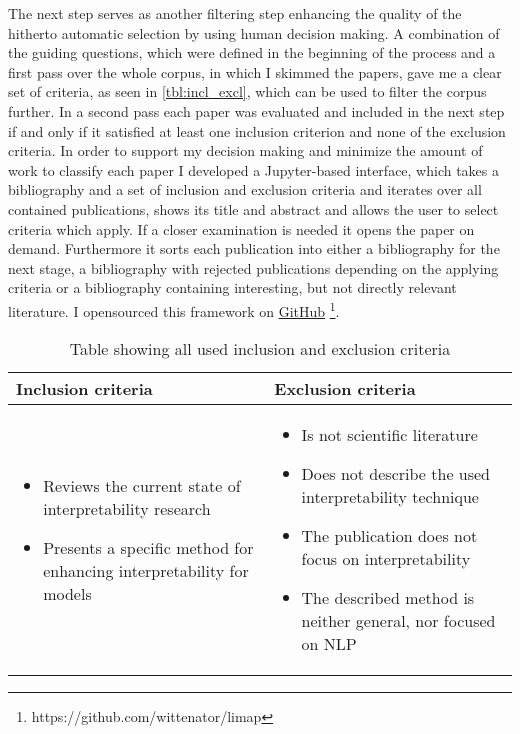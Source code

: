 \begin{enumerate}
	The next step serves as another filtering step enhancing the quality of the hitherto automatic selection by using human decision making. A combination of the guiding questions, which were defined in the beginning of the process and a first pass over the whole corpus, in which I skimmed the papers, gave me a clear set of criteria, as seen in \autoref{tbl:incl_excl}, which can be used to filter the corpus further. In a second pass each paper was evaluated and included in the next step if and only if it satisfied at least one inclusion criterion and none of the exclusion criteria.	In order to support my decision making and minimize the amount of work to classify each paper I developed a Jupyter-based interface, which takes a bibliography and a set of inclusion and exclusion criteria and iterates over all contained publications, shows its title and abstract and allows the user to select criteria which apply. If a closer examination is needed it opens the paper on demand. Furthermore it sorts each publication into either a bibliography for the next stage, a bibliography with rejected publications depending on the applying criteria or a bibliography containing interesting, but not directly relevant literature. I opensourced this framework on \href{https://github.com/wittenator/limap}{GitHub} \footnote{https://github.com/wittenator/limap}.
	
	\begin{table}
		\centering
		\begin{tabular}{  p{5cm} | p{5cm} }
			Inclusion criteria & Exclusion criteria  \\ \hline
			
			\begin{itemize}
				\item Reviews the current state of interpretability research
				\item Presents a specific method for enhancing interpretability for models
			\end{itemize}
			
			&
			
			\begin{itemize}
				\item Is not scientific literature
				\item Does not describe the used interpretability technique
				\item The publication does not focus on interpretability
				\item The described method is neither general, nor focused on NLP
			\end{itemize}
		\end{tabular}
		\caption{\label{tbl:incl_excl} Table showing all used inclusion and exclusion criteria}
	\end{table}


\end{enumerate}
